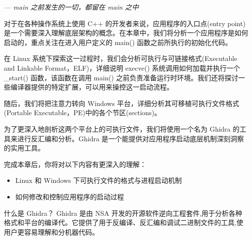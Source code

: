 
\begin{flushright}
\textit{--- main 之前发生的一切，都留在 main 之中}
\end{flushright}

对于在各种操作系统上使用 C++ 的开发者来说，应用程序的入口点(entry point)是一个需要深入理解底层架构的概念。在本章中，我们将分析一个应用程序是如何启动的，重点关注在进入用户定义的 main() 函数之前所执行的初始化代码。

在 Linux 系统下探索这一过程时，我们会分析可执行与可链接格式(Executable and Linkable Format，ELF)，详细说明 execve() 系统调用如何加载并执行一个 \_start() 函数，该函数在调用 main() 之前负责准备运行时环境。我们还将探讨一些编译器提供的特定扩展，可以用来操控这一启动流程。

随后，我们将把注意力转向 Windows 平台，详细分析其可移植可执行文件格式(Portable Executable，PE)中的各个节区(sections)。

为了更深入地剖析这两个平台上的可执行文件，我们将使用一个名为 Ghidra 的工具来进行反汇编和分析。Ghidra 是一个能提供对应用程序启动底层机制深刻洞察的实用工具。

完成本章后，你将对以下内容有更深入的理解：

\begin{itemize}
\item 
Linux 和 Windows 下可执行文件的格式与进程启动机制

\item 
如何修改和控制应用程序的启动过程
\end{itemize}

\begin{myTip}{什么是 Ghidra？}
Ghidra 是由 NSA 开发的开源软件逆向工程套件,用于分析各种格式和平台的编译代。它提供了用于反编译、反汇编和调试二进制文件的工具,使用户更容易理解和分机器代码。
\end{myTip}





